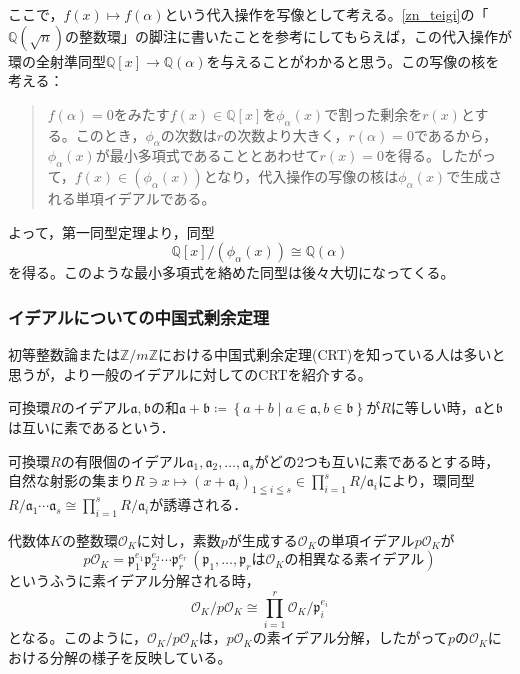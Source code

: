 ここで，$f(x)\mapsto f(\alpha)$という代入操作を写像として考える。\ref{zn_teigi}の「$\mathds{Q}(\sqrt{n})$の整数環」の脚注に書いたことを参考にしてもらえば，この代入操作が環の全射準同型$\mathds{Q}[x]\rightarrow \mathds{Q}(\alpha)$を与えることがわかると思う。この写像の核を考える：
\begin{quote}
    $f(\alpha)=0$をみたす$f(x)\in\mathds{Q}[x]$を$\phi_{\alpha}(x)$で割った剰余を$r(x)$とする。このとき，$\phi_{\alpha}$の次数は$r$の次数より大きく，$r(\alpha)=0$であるから，$\phi_{\alpha}(x)$が最小多項式であることとあわせて$r(x)=0$を得る。したがって，$f(x)\in(\phi_{\alpha}(x))$となり，代入操作の写像の核は$\phi_{\alpha}(x)$で生成される単項イデアルである。
\end{quote}
よって，第一同型定理より，同型
\begin{equation}\label{dokei_sp}
    \mathds{Q}[x]/(\phi_{\alpha}(x))\cong \mathds{Q}(\alpha)
\end{equation}
を得る。このような最小多項式を絡めた同型は後々大切になってくる。

\subsubsection{イデアルについての中国式剰余定理}
初等整数論または$\mathds{Z}/{m\mathds{Z}}$における中国式剰余定理(CRT)を知っている人は多いと思うが，より一般のイデアルに対してのCRTを紹介する。

\begin{dfn}
    可換環$R$のイデアル$\mathfrak{a,b}$の和$\mathfrak{a+b}\coloneqq \left\{a+b\mid a\in\mathfrak{a},b\in\mathfrak{b}\right\}$が$R$に等しい時，$\mathfrak{a}$と$\mathfrak{b}$は互いに素であるという．
\end{dfn}

\begin{thm}[CRT]
    可換環$R$の有限個のイデアル$\mathfrak{a}_1,\mathfrak{a}_2,\ldots,\mathfrak{a}_s$がどの2つも互いに素であるとする時，自然な射影の集まり$R\ni x\mapsto (x+\mathfrak{a}_i)_{1\leqq i\leqq s}\in\prod_{i=1}^{s}R/{\mathfrak{a}_i}$により，環同型$R/{\mathfrak{a}_1\cdots\mathfrak{a}_s}\cong\prod_{i=1}^{s}R/{\mathfrak{a}_i}$が誘導される．
\end{thm}

代数体$K$の整数環$\mathcal{O}_K$に対し，素数$p$が生成する$\mathcal{O}_K$の単項イデアル$p\mathcal{O}_K$が\[
p\mathcal{O}_K=\mathfrak{p}_1^{e_1}\mathfrak{p}_2^{e_2}\cdots\mathfrak{p}_r^{e_r}\,(\mathfrak{p}_1,\ldots,\mathfrak{p}_r\text{は}\mathcal{O}_K\text{の相異なる素イデアル})
\]というふうに素イデアル分解される時，
\begin{equation}\label{crt_apply}
\mathcal{O}_K/{p\mathcal{O}_K}\cong \prod_{i=1}^{r}\mathcal{O}_K/{\mathfrak{p}_i^{e_i}}
\end{equation}
となる。このように，$\mathcal{O}_K/{p\mathcal{O}_K}$は，$p\mathcal{O}_K$の素イデアル分解，したがって$p$の$\mathcal{O}_K$における分解の様子を反映している。

